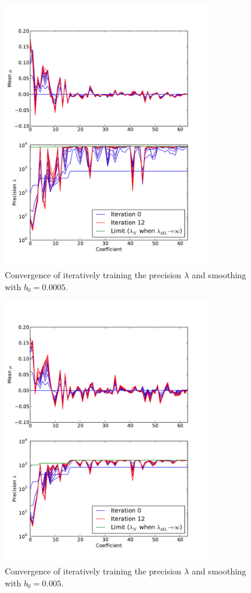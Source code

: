 \documentclass{report}
\begin{document}
\begin{figure}
    \centering
    \includegraphics[width=0.8\textwidth]{figs/p1.pdf}
    \caption{Convergence of iteratively training the precision $\lambda$ and smoothing with $b_0 = 0.0005$.} \label{fig:iter1}
\end{figure}

\begin{figure}
    \centering
    \includegraphics[width=0.8\textwidth]{figs/p2.pdf}
    \caption{Convergence of iteratively training the precision $\lambda$ and smoothing with $b_0 = 0.005$.} \label{fig:iter2}
\end{figure}
\end{document}
